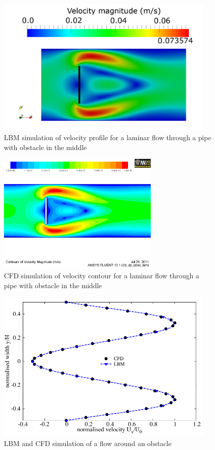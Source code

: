 \begin{figure}[htbp]
\centering
\hspace{-13mm}\includegraphics[width=0.95\textwidth]{LBM_Obstacle}
\caption{LBM simulation of velocity profile for a laminar flow through a pipe 
with obstacle in the middle}
\label{fig:Obstacle}
\end{figure}

\begin{figure}[htbp]
\centering
\includegraphics[width=0.7\textwidth]{CFD_Obstacle}
\caption{CFD simulation of velocity contour for a laminar flow through a pipe 
with obstacle in the middle}
\label{fig:obsvc}
\end{figure}

\begin{figure}[htbp]
\centering
\includegraphics[width=0.95\textwidth]{Obstacle}
\caption{LBM and CFD simulation of a flow around an obstacle}
\label{fig:LBMObstacle}
\end{figure}

